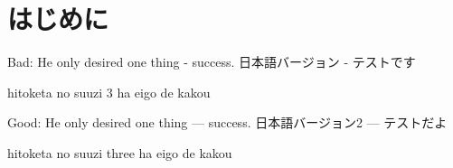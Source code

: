 \documentclass[bachelor,autodetect-engine]{thesis}
\begin{document}
\maketitle



\chapter{はじめに}


Bad: 
He only desired one thing - success. 
日本語バージョン - テストです

hitoketa no suuzi 3 ha eigo de kakou

Good: 
He only desired one thing --- success. 
日本語バージョン2 --- テストだよ

hitoketa no suuzi three ha eigo de kakou






\appendix


%
%
\end{document}
